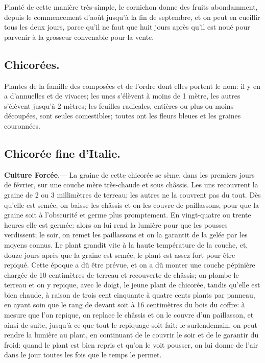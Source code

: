 \documentclass[10pt,a4paper]{book}
\begin{document}
Planté de cette manière très-simple, le cornichon donne des fruits abondamment, depuis le commencement d'août jusqu'à la fin de septembre, et on peut en cueillir tous les deux jours, parce qu'il ne faut que huit jours après qu'il est noué pour parvenir à la grosseur convenable pour la vente.

\subsection{Chicorées.}

Plantes de la famille des composées et de l'ordre dont elles portent le nom: il y en a d'annuelles et de vivaces; les unes s'élèvent à moins de 1 mètre, les autres s'élèvent jusqu'à 2 mètres; les feuilles radicales, entières ou plus ou moins découpées, sont seules comestibles; toutes ont les fleurs bleues et les graines couronnées.

\subsection{Chicorée fine d'Italie.}

\textbf{Culture Forcée}.--- La graine de cette chicorée se sème, dans les premiers jours de février, sur une couche mère très-chaude et sous châssis. Les uns recouvrent la graine de 2 ou 3 millimètres de terreau; les autres ne la couvrent pas du tout. Dès qu'elle est semée, on baisse les châssis et on les couvre de paillassons, pour que la graine soit à l'obscurité et germe plus promptement. En vingt-quatre ou trente heures elle est germée: alors on lui rend la lumière pour que les pousses verdissent; le soir, on remet les paillassons et on la garantit de la gelée par les moyens connus. Le plant grandit vite à la haute température de la couche, et, douze jours après que la graine est semée, le plant est assez fort pour être repiqué. Cette époque a dû être prévue, et on a dû monter une couche pépinière chargée de 10 centimètres de terreau et recouverte de châssis; on plombe le terreau et on y repique, avec le doigt, le jeune plant de chicorée, tandis qu'elle est bien chaude, à raison de trois cent cinquante à quatre cents plants par panneau, en ayant soin que le rang de devant soit à 16 centimètres du bois du coffre: à mesure que l'on repique, on replace le châssis et on le couvre d'un paillasson, et ainsi de suite, jusqu'à ce que tout le repiquage soit fait; le surlendemain, on peut rendre la lumière au plant, en continuant de le couvrir le soir et de le garantir du froid: quand le plant est bien repris et qu'on le voit pousser, on lui donne de l'air dans le jour toutes les fois que le temps le permet.
\end{document}
